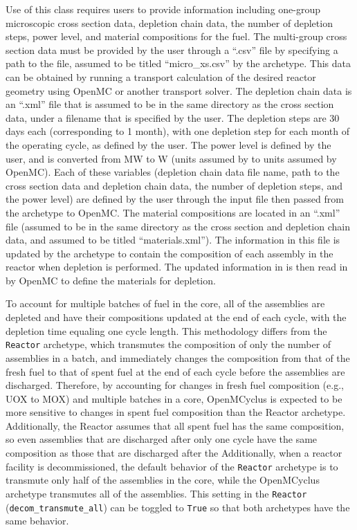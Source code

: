 Use of this class requires users to provide information including 
one-group microscopic cross section data, depletion chain data, the 
number of depletion steps, 
power level, and material compositions for the fuel. The multi-group 
cross section data must be provided by the user through a ``.csv'' file by 
specifying a path to the file, assumed to be titled ``micro\_xs.csv'' by the 
archetype. This data can be obtained by running a transport calculation 
of the desired reactor geometry using OpenMC or another transport solver. 
The depletion chain data is an ``.xml'' file that is assumed to be in the 
same directory as the cross section data, under a filename that is specified 
by the user.
The depletion steps are 30 days each (corresponding to 1 month), 
with one depletion step for each month of the operating cycle, as defined by 
the user. The power level is defined by the user, and is converted from 
MW to W (units assumed by \Cyclus to units assumed by OpenMC). Each of these 
variables (depletion chain data file name, path to the cross section data and 
depletion chain data, the number of depletion steps, and the power level) are 
defined by the user through the \Cyclus input file then passed from the archetype 
to OpenMC. The material compositions are located in an ``.xml'' file 
(assumed to be in the same directory as the cross section and depletion 
chain data, and assumed to be titled ``materials.xml''). The information 
in this file is updated by the archetype to 
contain the composition of each assembly in the reactor when depletion is 
performed. The updated information in is then read in
by OpenMC to define the materials for depletion. 

To account for multiple batches of fuel in the core, all of the assemblies 
are depleted and have their compositions updated 
at the end of each cycle, with the depletion time equaling one cycle 
length. This methodology differs from the \Cycamore 
\texttt{Reactor} archetype, which transmutes the composition of only the 
number of 
assemblies in a batch, and immediately changes the composition from that 
of the fresh fuel to that of spent fuel at the end of each cycle before the 
assemblies are discharged. Therefore, by accounting for 
changes in fresh fuel composition (e.g., UOX to MOX) and multiple 
batches in a core, OpenMCyclus is expected to be more sensitive to 
changes in spent fuel composition than the \Cycamore Reactor archetype. 
Additionally, the \Cycamore Reactor assumes that all spent fuel has the 
same composition, so even assemblies that are discharged after only one 
cycle have the same composition as those that are discharged after the
Additionally, when a reactor facility is decommissioned, the default behavior 
of the \Cycamore \texttt{Reactor} archetype is to transmute only half of the assemblies 
in the core, while the OpenMCyclus archetype transmutes all of the assemblies. 
This setting in the \Cycamore \texttt{Reactor} (\texttt{decom\_transmute\_all}) can be 
toggled to \texttt{True} so that both archetypes have the same behavior.

